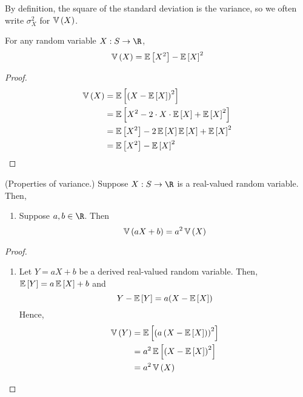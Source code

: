 \documentclass[11pt]{article}
\begin{document}
\begin{rem}
    By definition, the square of the standard deviation is the variance, so we
    often write $\sigma_X^2$ for $\V{X}$.
\end{rem}

\begin{thm}
    \label{thm:alternative-variance}
    For any random variable $X : S \to \R$,
    \begin{equation*}
        \V{X} = \E{X^2} - \E{X}^2
    \end{equation*}
\end{thm}

\begin{proof}
    \begin{align*}
        \V{X}
        &= \E{\parens{X - \E{X}}^2} \\
        &= \E{X^2 - 2 \cdot X \cdot \E{X} + \E{X}^2} \\
        &= \E{X^2} - 2 \E{X} \E{X} + \E{X}^2 \\
        &= \E{X^2} - \E{X}^2
    \end{align*}
\end{proof}

\begin{thm}{(Properties of variance.)}
    \label{thm:variance-properties}
    Suppose $X : S \to \R$ is a real-valued random variable. Then,
    \begin{enumerate}
        \item
            Suppose $a, b \in \R$. Then
            \begin{equation}
                \label{eq:variance-linearity}
                \V{a X + b} = a^2 \V{X}
            \end{equation}
    \end{enumerate}
\end{thm}

\begin{proof}
    \begin{enumerate}
        \item
            Let $Y = a X + b$ be a derived real-valued random variable.
            Then, $\E{Y} = a \E{X} + b$ and
            \begin{equation*}
                Y - \E{Y} = a(X - \E{X})
            \end{equation*}
            Hence,
            \begin{align*}
                \V{Y}
                &= \E{\parens{a\parens{X - \E{X}}}^2} \\
                &= a^2 \E{\parens{X - \E{X}}^2} \\
                &= a^2 \V{X}
            \end{align*}
    \end{enumerate}
\end{proof}
\end{document}
